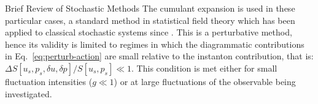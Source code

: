 \begin{chapter}{Brief Review of Stochastic Methods}
The cumulant expansion is used in these particular cases, a standard method in statistical field theory which has been applied to classical stochastic systems since \textcite{langouche1979}.
This is a perturbative method, hence its validity is limited to regimes in which the diagrammatic contributions in Eq.~\eqref{eq:perturb-action} are small relative to the instanton contribution, that is: $\Delta S[ u_s, p_s, \delta u, \delta p] / S[u_s,p_s] \ll 1$. This condition is met either for small fluctuation intensities ($g \ll 1$) or at large fluctuations of the observable being investigated.

\end{chapter}
